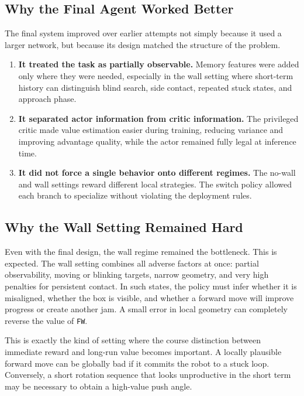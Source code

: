 \documentclass[11pt]{article}
\begin{document}
\subsection{Why the Final Agent Worked Better}

The final system improved over earlier attempts not simply because it used a larger
network, but because its design matched the structure of the problem.

\begin{enumerate}[leftmargin=1.5em]
  \item \textbf{It treated the task as partially observable.} Memory features were added
  only where they were needed, especially in the wall setting where short-term history
  can distinguish blind search, side contact, repeated stuck states, and approach phase.

  \item \textbf{It separated actor information from critic information.} The privileged
  critic made value estimation easier during training, reducing variance and improving
  advantage quality, while the actor remained fully legal at inference time.

  \item \textbf{It did not force a single behavior onto different regimes.} The no-wall and
  wall settings reward different local strategies. The switch policy allowed each branch to
  specialize without violating the deployment rules.
\end{enumerate}

\subsection{Why the Wall Setting Remained Hard}

Even with the final design, the wall regime remained the bottleneck. This is expected.
The wall setting combines all adverse factors at once: partial observability, moving or
blinking targets, narrow geometry, and very high penalties for persistent contact. In
such states, the policy must infer whether it is misaligned, whether the box is visible,
and whether a forward move will improve progress or create another jam. A small error
in local geometry can completely reverse the value of \texttt{FW}.

This is exactly the kind of setting where the course distinction between immediate reward
and long-run value becomes important. A locally plausible forward move can be globally
bad if it commits the robot to a stuck loop. Conversely, a short rotation sequence that
looks unproductive in the short term may be necessary to obtain a high-value push angle.
\end{document}
